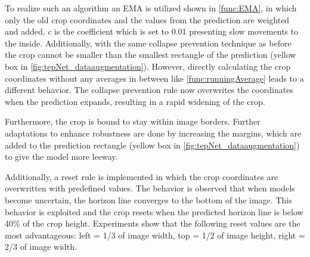 To realize such an algorithm an \ac{EMA} is utilized shown in \autoref{func:EMA}, in which only the old crop coordinates and the values from the prediction are weighted and added.
$c$ is the coefficient which is set to 0.01 presenting slow movements to the inside.
Additionally, with the same collapse prevention technique as before the crop cannot be smaller than the smallest rectangle of the prediction (yellow box in \autoref{fig:tepNet_dataaugmentation}).
However, directly calculating the crop coordinates without any averages in between like \autoref{func:runningAverage} leads to a different behavior.
The collapse prevention rule now overwrites the coordinates when the prediction expands, resulting in a rapid widening of the crop.

Furthermore, the crop is bound to stay within image borders.
Further adaptations to enhance robustness are done by increasing the margins, which are added to the prediction rectangle (yellow box in \autoref{fig:tepNet_dataaugmentation}) to give the model more leeway.

Additionally, a reset rule is implemented in which the crop coordinates are overwritten with predefined values.
The behavior is observed that when models become uncertain, the horizon line converges to the bottom of the image.
This behavior is exploited and the crop resets when the predicted horizon line is below 40\% of the crop height.
Experiments show that the following reset values are the most advantageous: left = 1/3 of image width, top = 1/2 of image height, right = 2/3 of image width.

